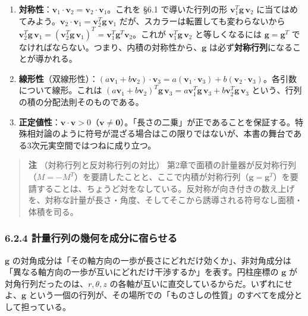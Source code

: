 \documentclass[a4paper,12pt,openany]{book}
\begin{document}
\begin{enumerate}
\def\labelenumi{\arabic{enumi}.}
\item
  \textbf{対称性}：\(\mathbf{v}_1 \cdot \mathbf{v}_2 = \mathbf{v}_2 \cdot \mathbf{v}_1\)。これを
  §6.1 で導いた行列の形 \(\mathbf{v}_1^T \mathbf{g} \,\mathbf{v}_2\)
  に当てはめてみよう。\(\mathbf{v}_2 \cdot \mathbf{v}_1 = \mathbf{v}_2^T \mathbf{g} \,\mathbf{v}_1\)
  だが、スカラーは転置しても変わらないから
  \(\mathbf{v}_2^T \mathbf{g} \,\mathbf{v}_1 = (\mathbf{v}_2^T \mathbf{g} \,\mathbf{v}_1)^T = \mathbf{v}_1^T \mathbf{g}^T \mathbf{v}_2\)。これが
  \(\mathbf{v}_1^T \mathbf{g} \,\mathbf{v}_2\) と等しくなるには
  \(\mathbf{g} = \mathbf{g}^T\)
  でなければならない。つまり、内積の対称性から、\(\mathbf{g}\)
  は必ず\textbf{対称行列}になることが導かれる。
\item
  \textbf{線形性}（双線形性）：\((a\mathbf{v}_1 + b\mathbf{v}_2) \cdot \mathbf{v}_3 = a(\mathbf{v}_1 \cdot \mathbf{v}_3) + b(\mathbf{v}_2 \cdot \mathbf{v}_3)\)。各引数について線形。これは
  \((a\mathbf{v}_1 + b\mathbf{v}_2)^T \mathbf{g} \,\mathbf{v}_3 = a\mathbf{v}_1^T \mathbf{g} \,\mathbf{v}_3 + b\mathbf{v}_2^T \mathbf{g} \,\mathbf{v}_3\)
  という、行列の積の分配法則そのものである。
\item
  \textbf{正定値性}：\(\mathbf{v} \cdot \mathbf{v} > 0\)（\(\mathbf{v} \neq \mathbf{0}\)）。「長さの二乗」が正であることを保証する。特殊相対論のように符号が混ざる場合はこの限りではないが、本書の舞台である3次元実空間ではつねに成り立つ。
\end{enumerate}

\begin{quote}
\textbf{注} （対称行列と反対称行列の対比）
第2章で面積の計量器が反対称行列（\(M = -M^T\)）を要請したことと、ここで内積が対称行列（\(\mathbf{g} = \mathbf{g}^T\)）を要請することは、ちょうど対をなしている。反対称が向き付きの数え上げを、対称な計量が長さ・角度、そしてそこから誘導される符号なし面積・体積を司る。
\end{quote}

\hypertarget{ux8a08ux91cfux884cux5217ux306eux5e7eux4f55ux3092ux6210ux5206ux306bux5bbfux3089ux305bux308b}{%
\subsubsection{6.2.4
計量行列の幾何を成分に宿らせる}\label{ux8a08ux91cfux884cux5217ux306eux5e7eux4f55ux3092ux6210ux5206ux306bux5bbfux3089ux305bux308b}}

\(\mathbf{g}\)
の対角成分は「その軸方向の一歩が長さにどれだけ効くか」、非対角成分は「異なる軸方向の一歩が互いにどれだけ干渉するか」を表す。円柱座標の
\(\mathbf{g}\) が対角行列だったのは、\(r,\theta,z\)
の各軸が互いに直交しているからだ。いずれにせよ、\(\mathbf{g}\)
という一個の行列が、その場所での「ものさしの性質」のすべてを成分として担っている。
\end{document}
